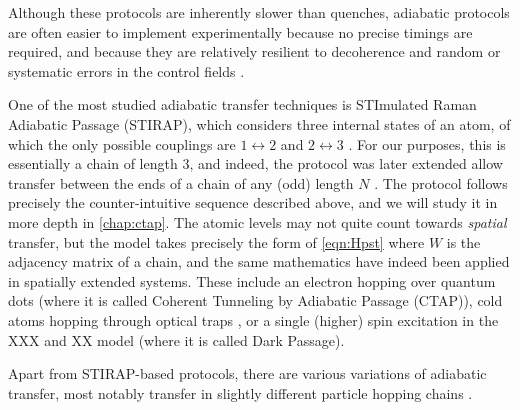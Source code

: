 Although these protocols are inherently slower than quenches, adiabatic protocols are often easier to implement experimentally because no precise timings are required, and because they are relatively resilient to decoherence and random or systematic errors in the control fields \cite{Childs2001, Farooq2015}. 

%


One of the most studied adiabatic transfer techniques is STImulated Raman Adiabatic Passage (STIRAP), which considers three internal states of an atom, of which the only possible couplings are $1 \leftrightarrow 2$ and $2 \leftrightarrow 3$ \cite{Gaubatz1990}. For our purposes, this is essentially a chain of length $3$, and indeed, the protocol was later extended allow transfer between the ends of a chain of any (odd) length $N$ \cite{Malinovsky1997}. The protocol follows precisely the counter-intuitive sequence described above, and we will study it in more depth in \cref{chap:ctap}. The atomic levels may not quite count towards \emph{spatial} transfer, but the model takes precisely the form of \cref{eqn:Hpst} where $W$ is the adjacency matrix of a chain, and the same mathematics have indeed been applied in spatially extended systems. These include an electron hopping over quantum dots \cite{Greentree2004} (where it is called Coherent Tunneling by Adiabatic Passage (CTAP)), cold atoms hopping through optical traps \cite{Eckert2004}, or a single (higher) spin excitation in the XXX \cite{Batey2015} and XX model \cite{Ohshima2007,Greentree2014} (where it is called Dark Passage).


Apart from STIRAP-based protocols, there are various variations of adiabatic transfer, most notably transfer in slightly different particle hopping chains \cite{Chen2012,Gratsea2018}.



